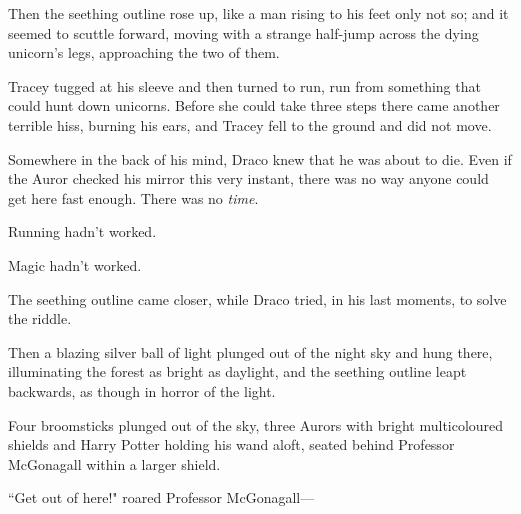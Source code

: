 Then the seething outline rose up, like a man rising to his feet only not so; and it seemed to scuttle forward, moving with a strange half-jump across the dying unicorn's legs, approaching the two of them.

Tracey tugged at his sleeve and then turned to run, run from something that could hunt down unicorns. Before she could take three steps there came another terrible hiss, burning his ears, and Tracey fell to the ground and did not move.

Somewhere in the back of his mind, Draco knew that he was about to die. Even if the Auror checked his mirror this very instant, there was no way anyone could get here fast enough. There was no \emph{time}.

Running hadn't worked.

Magic hadn't worked.

The seething outline came closer, while Draco tried, in his last moments, to solve the riddle.

Then a blazing silver ball of light plunged out of the night sky and hung there, illuminating the forest as bright as daylight, and the seething outline leapt backwards, as though in horror of the light.

Four broomsticks plunged out of the sky, three Aurors with bright multicoloured shields and Harry Potter holding his wand aloft, seated behind Professor McGonagall within a larger shield.

``Get out of here!" roared Professor McGonagall—

